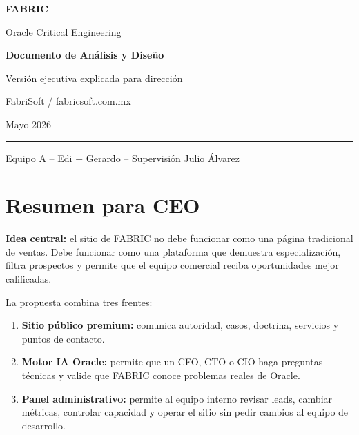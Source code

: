\documentclass[11pt,letterpaper]{article}
\begin{document}
\begin{titlepage}
\pagecolor{FabricBlack}\color{white}
\vspace*{2cm}
{\Huge\bfseries\sffamily FABRIC\par}
\vspace{0.3cm}
{\Large Oracle Critical Engineering\par}
\vfill
{\huge\bfseries Documento de An\'alisis y Dise\~no\par}
\vspace{0.35cm}
{\Large Versi\'on ejecutiva explicada para direcci\'on\par}
\vspace{1cm}
{\large FabriSoft / fabricsoft.com.mx\par}
{\large Mayo 2026\par}
\vfill
{\color{FabricChampagne}\rule{\textwidth}{1.2pt}}\par
\vspace{0.4cm}
{\large Equipo A -- Edi + Gerardo -- Supervisi\'on Julio \'Alvarez\par}
\end{titlepage}
\nopagecolor\color{FabricText}

\tableofcontents
\newpage

\section*{Resumen para CEO}

\begin{executivebox}
\textbf{Idea central:} el sitio de FABRIC no debe funcionar como una p\'agina tradicional de ventas. Debe funcionar como una plataforma que demuestra especializaci\'on, filtra prospectos y permite que el equipo comercial reciba oportunidades mejor calificadas.
\end{executivebox}

La propuesta combina tres frentes:

\begin{enumerate}
\item \textbf{Sitio p\'ublico premium:} comunica autoridad, casos, doctrina, servicios y puntos de contacto.
\item \textbf{Motor IA Oracle:} permite que un CFO, CTO o CIO haga preguntas t\'ecnicas y valide que FABRIC conoce problemas reales de Oracle.
\item \textbf{Panel administrativo:} permite al equipo interno revisar leads, cambiar m\'etricas, controlar capacidad y operar el sitio sin pedir cambios al equipo de desarrollo.
\end{enumerate}
\end{document}
